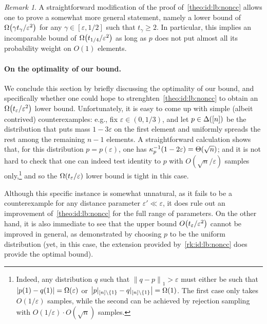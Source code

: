 \documentclass[11pt]{article}
\theoremstyle{remark}   	\newtheorem{remark}[theorem]{Remark}
\theoremstyle{definition}   	\newaliascnt{defn}{theorem}
\newcommand{\eps}{\ensuremath{\varepsilon}\xspace}
\newcommand{\bigO}[1]{{O\mleft( #1 \mright)}}
\newcommand{\bigTheta}[1]{{\Theta\mleft( #1 \mright)}}
\newcommand{\bigOmega}[1]{{\Omega\mleft( #1 \mright)}}
\newcommand{\norm}[1]{\lVert#1{\rVert}}
\newcommand{\normone}[1]{{\norm{#1}}_1}
\newcommand{\abs}[1]{\left\lvert #1 \right\rvert}
\newcommand{\kf}[1]{\kappa_{#1}}
\begin{document}
\begin{remark}\label{rk:id:lb:noncc}
  A straightforward modification of the proof of~\autoref{theo:id:lb:noncc} allows one to prove a somewhat more general statement, namely a lower bound of $\bigOmega{\gamma t_\gamma/\eps^2}$ for any $\gamma\in [\eps, 1/2]$ such that $t_\gamma \geq 2$. In particular, this implies an incomparable bound of $\bigOmega{t_{1/4}/\eps^2}$ as long as $p$ does not put almost all its probability weight on $O(1)$ elements.
\end{remark}

\paragraph{On the optimality of our bound.}
We conclude this section by briefly discussing the optimality of our bound, and specifically whether one could hope to strenghten~\autoref{theo:id:lb:noncc} to obtain an $\bigOmega{{t_{\eps}}/{\eps^2}}$ lower bound. Unfortunately, it is easy to come up with simple (albeit contrived) counterexamples: e.g., fix $\eps\in(0,1/3)$, and let $p\in\Delta\!\left([n]\right)$ be the distribution that puts mass $1-3\eps$ on the first element and uniformly spreads the rest among the remaining $n-1$ elements. A straightforward calculation shows that, for this distribution $p=p(\eps)$, one has $\kf{p}^{-1}(1-2\eps) = \bigTheta{\sqrt{n}}$; and it is not hard to check that one can indeed test identity to $p$ with $O(\sqrt{n}/\eps)$ samples only,\footnote{Indeed, any distribution $q$ such that $\normone{q-p} > \eps$ must either be such that $\abs{p(1)-q(1)} = \bigOmega{\eps}$ or $\abs{p|_{[n]\setminus\{1\}}-q|_{[n]\setminus\{1\}}} = \bigOmega{1}$. The first case only takes $O(1/\eps)$ samples, while the second can be achieved by rejection sampling with $O(1/\eps)\cdot O(\sqrt{n})$ samples.} and so the $\bigOmega{{t_{\eps}}/{\eps}}$ lower bound is tight in this case.

Although this specific instance is somewhat unnatural, as it fails to be a counterexample for any distance parameter $\eps' \ll \eps$, it does rule out an improvement of~\autoref{theo:id:lb:noncc} for the full range of parameters. On the other hand, it is also immediate to see that the upper bound $\bigO{{t_{\eps}}/{\eps^2}}$ cannot be improved in general, as demonstrated by choosing $p$ to be the uniform distribution (yet, in this case, the extension provided by~\autoref{rk:id:lb:noncc} does provide the optimal bound).  
\end{document}
